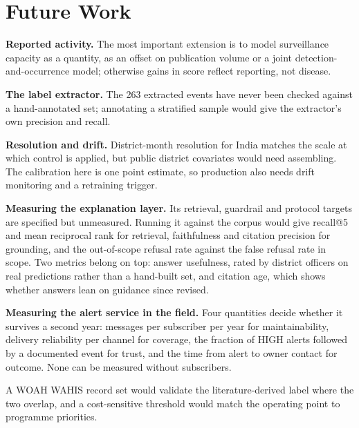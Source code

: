 \documentclass[10pt,openany]{report}
\begin{document}
\section{Future Work}

\textbf{Reported activity.} The most important extension is to model surveillance capacity as a
quantity, as an offset on publication volume or a joint detection-and-occurrence model; otherwise gains in score reflect reporting, not disease.

\textbf{The label extractor.} The 263 extracted events have never been checked against a
hand-annotated set; annotating a stratified sample would give the extractor's own precision and
recall.

\textbf{Resolution and drift.} District-month resolution for India matches the scale at which
control is applied, but public district covariates would need assembling. The calibration here is one
point estimate, so production also needs drift monitoring and a retraining trigger.

\textbf{Measuring the explanation layer.} Its retrieval, guardrail and protocol targets are
specified but unmeasured. Running it against the corpus would give recall@5 and mean reciprocal rank
for retrieval, faithfulness and citation precision for grounding, and the out-of-scope refusal rate
against the false refusal rate in scope. Two metrics belong on top: answer usefulness, rated by
district officers on real predictions rather than a hand-built set, and citation age, which shows
whether answers lean on guidance since revised.

\textbf{Measuring the alert service in the field.} Four quantities decide whether it survives a
second year: messages per subscriber per year for maintainability, delivery reliability per channel
for coverage, the fraction of HIGH alerts followed by a documented event for trust, and the time from
alert to owner contact for outcome. None can be measured without subscribers.

A WOAH WAHIS record set \cite{wahis} would validate the literature-derived label where the two
overlap, and a cost-sensitive threshold would match the operating point to programme priorities.

\newpage
\end{document}
